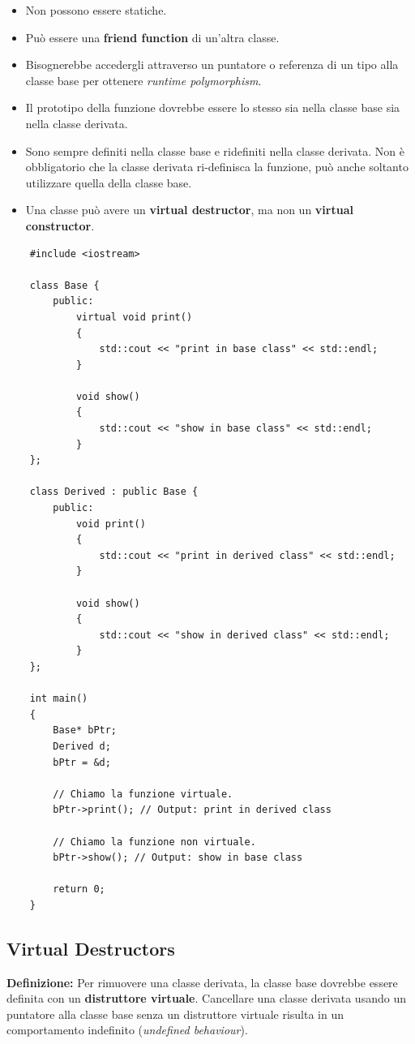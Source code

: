 \begin{itemize}
	\item \textsf{\small Non possono essere statiche.}
	\item \textsf{\small Può essere una \textbf{friend function} di un'altra classe.}
	\item \textsf{\small Bisognerebbe accedergli attraverso un puntatore o referenza di un tipo alla classe base per ottenere \emph{runtime polymorphism}.}
	\item \textsf{\small Il prototipo della funzione dovrebbe essere lo stesso sia nella classe base sia nella classe derivata.}
	\item \textsf{\small Sono sempre definiti nella classe base e ridefiniti nella classe derivata. Non è obbligatorio che la classe derivata ri-definisca la funzione, può anche soltanto utilizzare quella della classe base.}
	\item \textsf{\small Una classe può avere un \textbf{virtual destructor}, ma non un \textbf{virtual constructor}.}
\end{itemize}

\begin{lstlisting}
	#include <iostream>
	
	class Base {
		public:
			virtual void print()
			{
				std::cout << "print in base class" << std::endl;
			}
		
			void show()
			{
				std::cout << "show in base class" << std::endl;
			}
	};

	class Derived : public Base {
		public:
			void print()
			{
				std::cout << "print in derived class" << std::endl;
			}
		
			void show()
			{
				std::cout << "show in derived class" << std::endl;
			}
	};

	int main()
	{
		Base* bPtr;
		Derived d;
		bPtr = &d;
		
		// Chiamo la funzione virtuale.
		bPtr->print(); // Output: print in derived class
		
		// Chiamo la funzione non virtuale.
		bPtr->show(); // Output: show in base class
		
		return 0;
	}
\end{lstlisting}

\subsection{Virtual Destructors}

\textsf{\small \textbf{Definizione:} Per rimuovere una classe derivata, la classe base dovrebbe essere definita con un \textbf{distruttore virtuale}. Cancellare una classe derivata usando un puntatore alla classe base senza un distruttore virtuale risulta in un comportamento indefinito (\emph{undefined behaviour}).} \\

